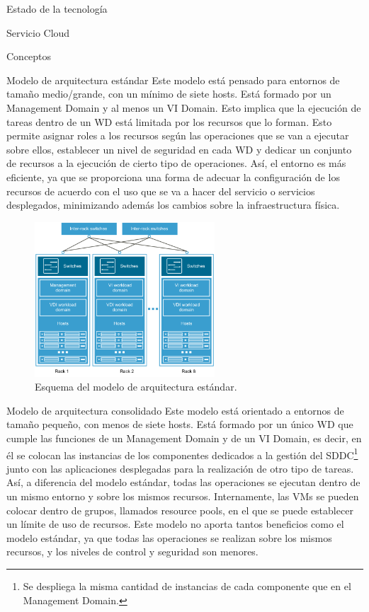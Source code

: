 \begin{chapter}{Estado de la tecnología}
\begin{section}{Servicio Cloud}
\begin{subsection}{Conceptos}
        \begin{subsubsection}{Modelo de arquitectura estándar}
        Este modelo está pensado para entornos de tamaño medio/grande, con un mínimo de siete hosts. Está formado por un Management Domain y al menos un VI Domain. Esto implica que la ejecución de tareas dentro de un WD está limitada por los recursos que lo forman. Esto permite asignar roles a los recursos según las operaciones que se van a ejecutar sobre ellos, establecer un nivel de seguridad en cada WD y dedicar un conjunto de recursos a la ejecución de cierto tipo de operaciones. Así, el entorno es más eficiente, ya que se proporciona una forma de adecuar la configuración de los recursos de acuerdo con el uso que se va a hacer del servicio o servicios desplegados, minimizando además los cambios sobre la infraestructura física.
        \begin{figure}[h!]
          \centering
          \includegraphics[width=0.6\textwidth]{imaxes/conceptosPrevios/arquitect_standarCF.png}
          \caption{Esquema del modelo de arquitectura estándar.}
          \label{fig:modelostandard}
        \end{figure}
        \FloatBarrier
        \end{subsubsection}
        \begin{subsubsection}{Modelo de arquitectura consolidado}
        Este modelo está orientado a entornos de tamaño pequeño, con menos de siete hosts. Está formado por un único WD que cumple las funciones de un Management Domain y de un VI Domain, es decir, en él se colocan las instancias de los componentes dedicados a la gestión del SDDC\footnote{Se despliega la misma cantidad de instancias de cada componente que en el Management Domain.} junto con las aplicaciones desplegadas para la realización de otro tipo de tareas. Así, a diferencia del modelo estándar, todas las operaciones se ejecutan dentro de un mismo entorno y sobre los mismos recursos. Internamente, las VMs se pueden colocar dentro de grupos, llamados resource pools, en el que se puede establecer un límite de uso de recursos. Este modelo no aporta tantos beneficios como el modelo estándar, ya que todas las operaciones se realizan sobre los mismos recursos, y los niveles de control y seguridad son menores.       

\end{subsubsection}
\end{subsection}
\end{section}
\end{chapter}
